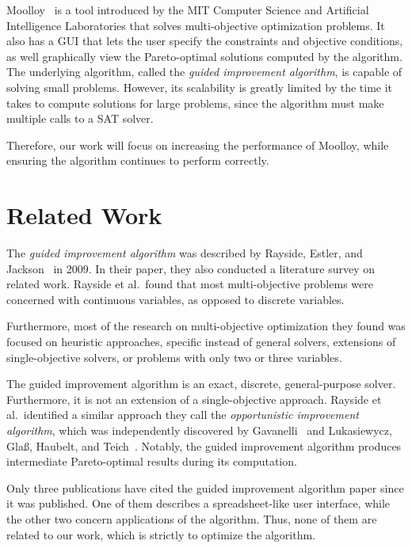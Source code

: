 \documentclass[11pt]{article}
\begin{document}
Moolloy~\cite{ref:Rayside09} is a tool introduced by the MIT Computer
Science and Artificial Intelligence Laboratories that solves
multi-objective optimization problems. It also has a GUI that lets the
user specify the constraints and objective conditions, as well
graphically view the Pareto-optimal solutions computed by the
algorithm. The underlying algorithm, called the \textit{guided
improvement algorithm}, is capable of solving small problems. However,
its scalability is greatly limited by the time it takes to compute
solutions for large problems, since the algorithm must make multiple
calls to a SAT solver.

Therefore, our work will focus on increasing the performance of
Moolloy, while ensuring the algorithm continues to perform correctly.

\section{Related Work}\label{sec:related_work}

The \textit{guided improvement algorithm} was described by Rayside,
Estler, and Jackson~\cite{ref:Rayside09} in 2009. In their paper, they
also conducted a literature survey on related work. Rayside et al.\
found that most multi-objective problems were concerned with continuous
variables, as opposed to discrete variables.

Furthermore, most of the research on multi-objective optimization they
found was focused on heuristic approaches, specific instead of general
solvers, extensions of single-objective solvers, or problems with only
two or three variables.

The guided improvement algorithm is an exact, discrete, general-purpose
solver. Furthermore, it is not an extension of a single-objective
approach. Rayside et al.\ identified a similar approach they call the
\textit{opportunistic improvement algorithm}, which was independently
discovered by Gavanelli~\cite{ref:Gavanelli02} and Lukasiewycz, Gla\ss,
Haubelt, and Teich~\cite{ref:Lukas07}. Notably, the guided improvement
algorithm produces intermediate Pareto-optimal results during its
computation.

Only three publications have cited the guided improvement algorithm
paper since it was published. One of them describes a spreadsheet-like
user interface, while the other two concern applications of the
algorithm. Thus, none of them are related to our work, which is
strictly to optimize the algorithm.
\end{document}
